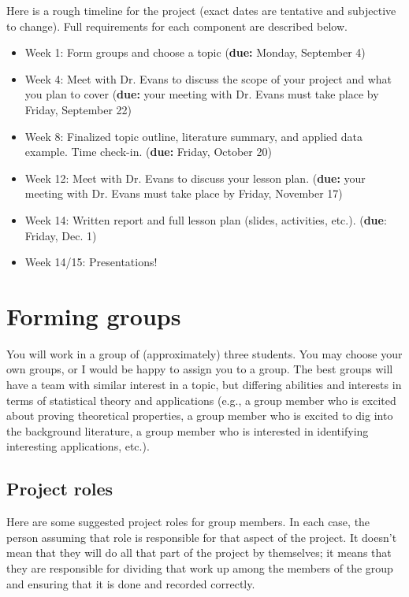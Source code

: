 \documentclass[11pt]{article}
\begin{document}
Here is a rough timeline for the project (exact dates are tentative and subjective to change). Full requirements for each component are described below.

\begin{itemize}
\item Week 1: Form groups and choose a topic (\textbf{due:} Monday, September 4)
\item Week 4: Meet with Dr. Evans to discuss the scope of your project and what you plan to cover (\textbf{due:} your meeting with Dr. Evans must take place by Friday, September 22)
\item Week 8: Finalized topic outline, literature summary, and applied data example. Time check-in. (\textbf{due:} Friday, October 20)
\item Week 12: Meet with Dr. Evans to discuss your lesson plan. (\textbf{due:} your meeting with Dr. Evans must take place by Friday, November 17)
\item Week 14: Written report and full lesson plan (slides, activities, etc.). (\textbf{due}: Friday, Dec. 1)
\item Week 14/15: Presentations!
\end{itemize}

\newpage

\section*{Forming groups}

You will work in a group of (approximately) three students. You may choose your own groups, or I would be happy to assign you to a group. The best groups will have a team with similar interest in a topic, but differing abilities and interests in terms of statistical theory and applications (e.g., a group member who is excited about proving theoretical properties, a group member who is excited to dig into the background literature, a group member who is interested in identifying interesting applications, etc.).

\subsection*{Project roles}

Here are some suggested project roles for group members. In each case, the person assuming that role is responsible for that aspect of the project. It doesn't mean that they will do all that part of the project by themselves; it means that they are responsible for dividing that work up among the members of the group and ensuring that it is done and recorded correctly.
\end{document}
